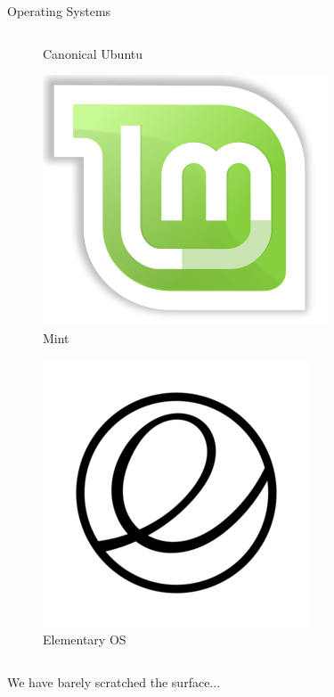 \documentclass[10pt]{beamer}
\begin{document}
\begin{frame}{Operating Systems}
\begin{columns}
\begin{column}{0.5\textwidth}
\begin{figure}
                    \caption{Canonical Ubuntu}
                \end{figure}
                \begin{figure}
                    \includegraphics[height=0.12\paperheight]{images/mint}
                    \caption{Mint}
                \end{figure}
                \begin{figure}
                    \includegraphics[height=0.12\paperheight]{images/elementaryos}
                    \caption{Elementary OS}
                \end{figure}
            \end{column}
        \end{columns}
    \end{frame}
    
    \begin{frame}
        \begin{Huge}
            We have barely scratched the surface...
        \end{Huge}
    \end{frame}
\end{document}
